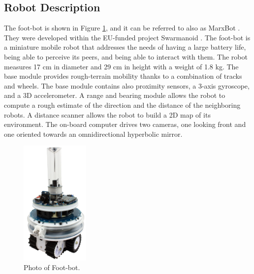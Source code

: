 \documentclass[../../Thesis.tex]{subfiles}
\begin{document}
		\subsection{Robot Description}
		\label{sec:Robot_description}%
			The foot-bot is shown in Figure \ref{fig:Footbot_photo}, and it can be referred to also as MarxBot \cite{Bonani2010}. They were developed within the EU-funded project Swarmanoid \cite{Swarmanoid2006}. The foot-bot is a miniature mobile robot that addresses the needs of having a large battery life, being able to perceive its peers, and being able to interact with them.  The robot measures 17 cm in diameter and 29 cm in height with a weight of 1.8 kg. The base module provides rough-terrain mobility thanks to a combination of tracks and wheels. The base module contains also proximity sensors, a 3-axis gyroscope, and a 3D accelerometer. A range and bearing module allows the robot to compute a rough estimate of the direction and the distance of the neighboring robots. A distance scanner allows the robot to build a 2D map of its environment. The on-board computer drives two cameras, one looking front and one oriented towards an omnidirectional hyperbolic mirror.\\
			\begin{figure}
			    \centering
			    \includegraphics[width=0.3\textwidth]{../../Images/Data_collection/footbot-final.jpeg}
			    \caption{Photo of Foot-bot.}
			    \label{fig:Footbot_photo}
			\end{figure}
\end{document}
